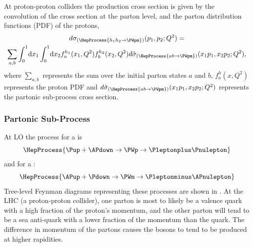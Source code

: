 At proton-proton colliders the \PW production cross section is given by the
convolution of the cross section at the parton level, and the parton
distribution functions (PDF) of the protons,
\begin{multline}
  d\sigma_{(\HepProcess{h_1 h_2 \to \PWpm})}(p_1,p_2;Q^{2}) = \\
  \sum\limits_{a,b}
  \int_0^1 \! \mathrm{d} x_1 
  \int_0^1 \! \mathrm{d} x_2 
  f_a^{h_1}(x_1,Q^2)
  f_b^{h_2}(x_2,Q^2) 
  d\hat{\sigma}_{(\HepProcess{a b \to \PWpm})}(x_1 p_1, x_2 p_2; Q^2),
  \label{wbos:xsec}
\end{multline}
where $\sum\limits_{a,b}$ represents the sum over the initial parton states $a$
and $b$, $f_a^{h}(x,Q^2)$ represents the proton {PDF} and
$d\hat{\sigma}_{(\HepProcess{a b \to \PWpm})}(x_1 p_1, x_2 p_2; Q^2)$
represents the partonic sub-process cross section.

\subsubsection*{Partonic Sub-Process}

At {LO} the process for a \PWp is
\begin{equation}
  \HepProcess{\Pup + \APdown \to \PWp \to \Pleptonplus \Pnulepton} 
  \label{wbos:wpprod} 
\end{equation}
and for a \PWm:
\begin{equation}
  \HepProcess{\APup + \Pdown \to \PWm \to \Pleptonminus \APnulepton}
  \label{wbos:wmprod} 
\end{equation}
Tree-level Feynman diagrams representing these processes are shown in
.
At the {LHC} (a proton-proton collider), one parton is most to likely be a
valence quark with a high fraction of the proton's momentum, and the other
parton will tend to be a sea anti-quark with a lower fraction of the momentum
than the quark. The difference in momentum of the partons causes the \PW bosons 
to tend to be produced at higher rapidities. 

